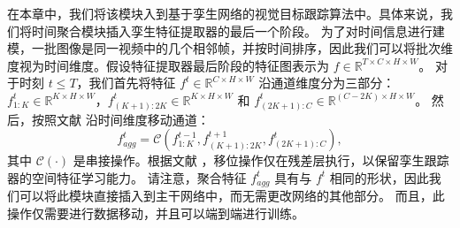 在本章中，我们将该模块入到基于孪生网络的视觉目标跟踪算法中。具体来说，我们将时间聚合模块插入孪生特征提取器的最后一个阶段。
为了对时间信息进行建模，一批图像是同一视频中的几个相邻帧，并按时间排序，因此我们可以将批次维度视为时间维度。假设特征提取器最后阶段的特征图表示为 $f \in \mathbb R ^ {T \times C \times H \times W}$。
对于时刻 $t \leq T$，我们首先将特征 $f^t \in \mathbb R ^ {C \times H \times W}$ 沿通道维度分为三部分：$f_{1:K}^t \in \mathbb R ^ {K \times H \times W}$，$f_{(K+1):2K}^t \in \mathbb R ^ {K \times H \times W}$ 和 $f_{(2K+1):C}^t \in \mathbb R ^ {(C-2K) \times H \times W}$。
然后，按照文献 \cite{lin2019tsm} 沿时间维度移动通道：
\begin{equation}
    f_{agg}^t = \mathcal{C}(f_{{1:K}}^{t-1}, f_{(K+1):2K}^{t+1}, f_{(2K+1):C}^{t}),
\end{equation}
其中 $\mathcal{C}(\cdot)$ 是串接操作。根据文献 \cite{lin2019tsm}，移位操作仅在残差层执行，以保留孪生跟踪器的空间特征学习能力。
请注意，聚合特征 $f_{agg}^t$ 具有与 $f^t$ 相同的形状，因此我们可以将此模块直接插入到主干网络中，而无需更改网络的其他部分。
而且，此操作仅需要进行数据移动，并且可以端到端进行训练。

